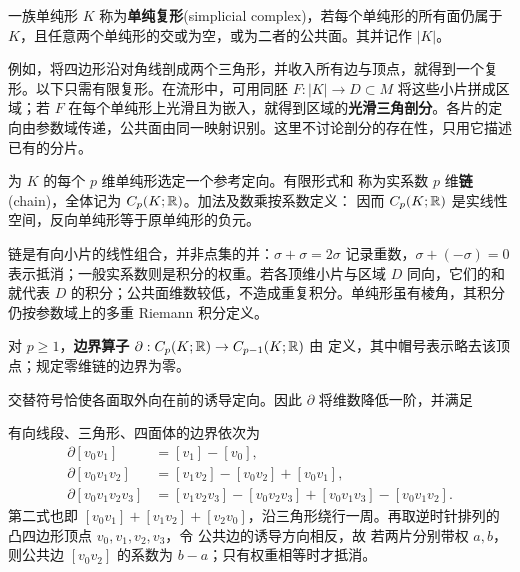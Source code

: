 \begin{definition}
    一族单纯形 $K$ 称为\textbf{单纯复形}(simplicial complex)，若每个单纯形的所有面仍属于 $K$，且任意两个单纯形的交或为空，或为二者的公共面。其并记作 $|K|$。
\end{definition}

例如，将四边形沿对角线剖成两个三角形，并收入所有边与顶点，就得到一个复形。以下只需有限复形。在流形中，可用同胚 $F:|K|\to D\subset M$ 将这些小片拼成区域；若 $F$ 在每个单纯形上光滑且为嵌入，就得到区域的\textbf{光滑三角剖分}。各片的定向由参数域传递，公共面由同一映射识别。这里不讨论剖分的存在性，只用它描述已有的分片。

\begin{definition}
    为 $K$ 的每个 $p$ 维单纯形选定一个参考定向。有限形式和
    称为实系数 $p$ 维\textbf{链}(chain)，全体记为 $C_p(K;\mathbb{R})$。加法及数乘按系数定义：
    因而 $C_p(K;\mathbb{R})$ 是实线性空间，反向单纯形等于原单纯形的负元。
\end{definition}

链是有向小片的线性组合，并非点集的并：$\sigma+\sigma=2\sigma$ 记录重数，$\sigma+(-\sigma)=0$ 表示抵消；一般实系数则是积分的权重。若各顶维小片与区域 $D$ 同向，它们的和就代表 $D$ 的积分；公共面维数较低，不造成重复积分。单纯形虽有棱角，其积分仍按参数域上的多重 Riemann 积分定义。

\begin{definition}
    对 $p\geqslant1$，\textbf{边界算子} $\partial:C_p(K;\mathbb{R})\to C_{p-1}(K;\mathbb{R})$ 由
    定义，其中帽号表示略去该顶点；规定零维链的边界为零。
\end{definition}

交替符号恰使各面取外向在前的诱导定向。因此 $\partial$ 将维数降低一阶，并满足

\begin{example}
    有向线段、三角形、四面体的边界依次为
    \begin{align*}
        \partial[v_0v_1]&=[v_1]-[v_0],\\
        \partial[v_0v_1v_2]&=[v_1v_2]-[v_0v_2]+[v_0v_1],\\
        \partial[v_0v_1v_2v_3]&=[v_1v_2v_3]-[v_0v_2v_3]
            +[v_0v_1v_3]-[v_0v_1v_2].
    \end{align*}
    第二式也即 $[v_0v_1]+[v_1v_2]+[v_2v_0]$，沿三角形绕行一周。再取逆时针排列的凸四边形顶点 $v_0,v_1,v_2,v_3$，令
    公共边的诱导方向相反，故
    若两片分别带权 $a,b$，则公共边 $[v_0v_2]$ 的系数为 $b-a$；只有权重相等时才抵消。
\end{example}

